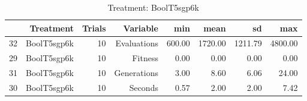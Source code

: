 \begin{table}[ht]
\centering
\begin{tabular}{rrrrrrrr}
  \hline
 & Treatment & Trials & Variable & min & mean & sd & max \\ 
  \hline
32 & BoolT5sgp6k &  10 & Evaluations & 600.00 & 1720.00 & 1211.79 & 4800.00 \\ 
  29 & BoolT5sgp6k &  10 & Fitness & 0.00 & 0.00 & 0.00 & 0.00 \\ 
  31 & BoolT5sgp6k &  10 & Generations & 3.00 & 8.60 & 6.06 & 24.00 \\ 
  30 & BoolT5sgp6k &  10 & Seconds & 0.57 & 2.00 & 2.00 & 7.42 \\ 
   \hline
\end{tabular}
\caption{Treatment: BoolT5sgp6k} 
\end{table}
